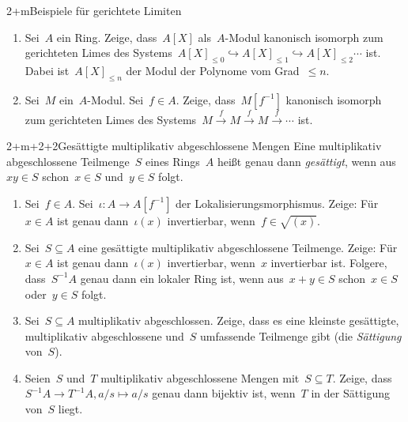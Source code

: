 \documentclass{uebblatt}
\begin{document}

\begin{aufgabe}{2+m}{Beispiele für gerichtete Limiten}
\begin{enumerate}
\item Sei~$A$ ein Ring. Zeige, dass~$A[X]$ als~$A$-Modul kanonisch isomorph zum
gerichteten Limes des Systems~$A[X]_{\leq0} \hookrightarrow A[X]_{\leq1}
\hookrightarrow A[X]_{\leq2} \cdots$ ist. Dabei ist~$A[X]_{\leq n}$ der Modul
der Polynome vom Grad~$\leq n$.
\item Sei~$M$ ein~$A$-Modul. Sei~$f \in A$. Zeige, dass~$M[f^{-1}]$ kanonisch
isomorph zum gerichteten Limes des Systems~$M \xrightarrow{f} M \xrightarrow{f}
M \xrightarrow{f} \cdots$ ist.
\end{enumerate}
\end{aufgabe}

\begin{aufgabe}{2+m+2+2}{Gesättigte multiplikativ abgeschlossene Mengen}
Eine multiplikativ abgeschlossene Teilmenge~$S$ eines Rings~$A$ heißt genau dann
\emph{gesättigt}, wenn aus~$xy \in S$ schon~$x \in S$ und~$y \in S$ folgt.
\begin{enumerate}
\item Sei~$f \in A$. Sei~$\iota : A \to A[f^{-1}]$ der
Lokalisierungsmorphismus. Zeige: Für~$x \in A$ ist genau dann~$\iota(x)$
invertierbar, wenn~$f \in \sqrt{(x)}$.
\item Sei~$S \subseteq A$ eine gesättigte multiplikativ abgeschlossene
Teilmenge. Zeige: Für~$x \in A$ ist genau dann~$\iota(x)$ invertierbar,
wenn~$x$ invertierbar ist.
Folgere, dass~$S^{-1}A$ genau dann ein lokaler Ring ist, wenn aus~$x + y \in S$
schon~$x \in S$ oder~$y \in S$ folgt.
\item Sei~$S \subseteq A$ multiplikativ abgeschlossen.
Zeige, dass es eine kleinste gesättigte, mul\-ti\-pli\-ka\-tiv abgeschlossene und~$S$
umfassende Teilmenge gibt (die \emph{Sättigung} von~$S$). 
\item Seien~$S$ und~$T$ multiplikativ abgeschlossene Mengen mit~$S \subseteq
T$. Zeige, dass~$S^{-1}A \to T^{-1}A, a/s \mapsto a/s$ genau
dann bijektiv ist, wenn~$T$ in der Sättigung von~$S$ liegt.
\end{enumerate}
\end{aufgabe}
\end{document}
